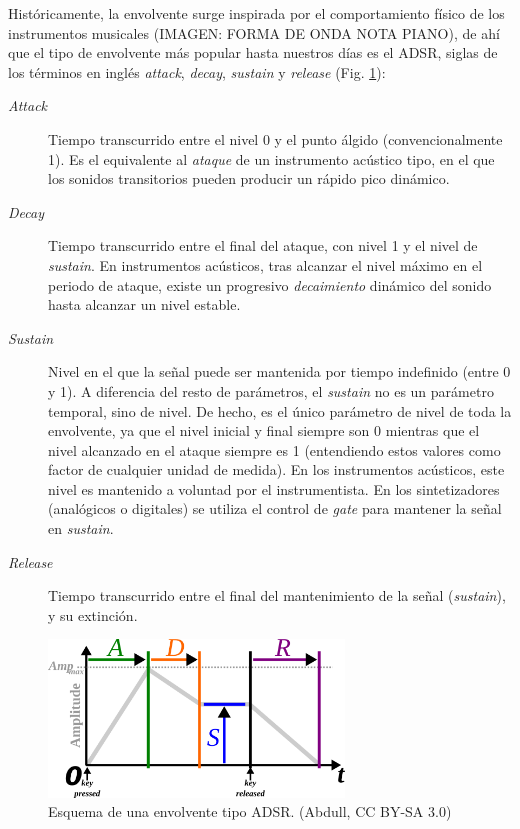 Históricamente, la envolvente surge inspirada por el comportamiento físico de los instrumentos musicales (IMAGEN: FORMA DE ONDA NOTA PIANO), de ahí que el tipo de envolvente más popular hasta nuestros días es el ADSR, siglas de los términos en inglés \textit{attack}, \textit{decay}, \textit{sustain} y \textit{release} (Fig. \ref{fig:adsr}):
\begin{description}
	\item[\textit{Attack}] Tiempo transcurrido entre el nivel 0 y el punto álgido (convencionalmente 1). Es el equivalente al \textit{ataque} de un instrumento acústico tipo, en el que los sonidos transitorios pueden producir un rápido pico dinámico.
	\item[\textit{Decay}] Tiempo transcurrido entre el final del ataque, con nivel 1 y el nivel de \textit{sustain}. En instrumentos acústicos, tras alcanzar el nivel máximo en el periodo de ataque, existe un progresivo \textit{decaimiento} dinámico del sonido hasta alcanzar un nivel estable.
	\item[\textit{Sustain}] Nivel en el que la señal puede ser mantenida por tiempo indefinido (entre 0 y 1). A diferencia del resto de parámetros, el \textit{sustain} no es un parámetro temporal, sino de nivel. De hecho, es el único parámetro de nivel de toda la envolvente, ya que el nivel inicial y final siempre son 0 mientras que el nivel alcanzado en el ataque siempre es 1 (entendiendo estos valores como factor de cualquier unidad de medida). En los instrumentos acústicos, este nivel es mantenido a voluntad por el instrumentista. En los sintetizadores (analógicos o digitales) se utiliza el control de \textit{gate} para mantener la señal en \textit{sustain}.
	\item[\textit{Release}] Tiempo transcurrido entre el final del mantenimiento de la señal (\textit{sustain}), y su extinción. 
\end{description} 

\begin{figure}
	\centering
	\includegraphics[width=0.7\textwidth]{images/env_ADSR}
	\caption[Esquema de una envolvente tipo ADSR]{Esquema de una envolvente tipo ADSR. (Abdull, CC BY-SA 3.0)}
	\label{fig:adsr}
\end{figure}


